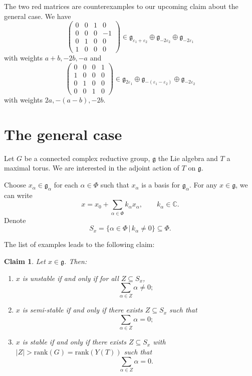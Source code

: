 \documentclass[12pt]{amsart}
\newcommand{\C}{\mathbb{C}}
\newcommand{\g}{\mathfrak{g}}
\newtheorem{claim}[theorem]{Claim}
\theoremstyle{remark}
\theoremstyle{remark}
\theoremstyle{remark}
\begin{document}
The two red matrices are counterexamples to our upcoming claim about the general case.
We have
$$
\begin{pmatrix} 
	0 & 0 & 1 & 0 \\ 
	0 & 0 & 0 & -1 \\
	0 & 1 & 0 & 0 \\
	1 & 0 & 0 & 0
\end{pmatrix} \in \g_{\varepsilon_1+\varepsilon_2} \oplus \g_{-2\varepsilon_2} \oplus \g_{-2\varepsilon_1}$$
with weights $a+b, -2b, -a$ and 
$$
\begin{pmatrix} 
	0 & 0 & 0 & 1 \\ 
	1 & 0 & 0 & 0 \\
	0 & 1 & 0 & 0 \\
	0 & 0 & 1 & 0
\end{pmatrix} \in \g_{2\varepsilon_1} \oplus \g_{-(\varepsilon_1 - \varepsilon_2)} \oplus \g_{-2\varepsilon_2}$$
with weights $2a, -(a-b), -2b$.

\section*{The general case}
Let $G$ be a connected complex reductive group, $\g$ the Lie algebra and $T$ a maximal torus.
We are interested in the adjoint action of $T$ on $\g$.

Choose $x_\alpha \in \g_\alpha$ for each $\alpha \in \Phi$ such that $x_\alpha$ is a basis for $\g_\alpha$.
For any $x \in \g$, we can write
$$x = x_0 + \sum_{\alpha \in \Phi} k_\alpha x_\alpha, \qquad k_\alpha \in \C.$$
Denote
$$S_x = \{\alpha \in \Phi \, | \, k_\alpha \ne 0\} \subseteq \Phi.$$

The list of examples leads to the following claim:

\begin{claim}
Let $x \in \g$.
Then:
\begin{enumerate}[label=(\roman*)]
\item
$x$ is unstable if and only if for all $Z \subseteq S_x$, 
$$\sum_{\alpha \in Z} \alpha \ne 0;$$

\item
$x$ is semi-stable if and only if there exists $Z \subseteq S_x$ such that
$$\sum_{\alpha \in Z} \alpha = 0;$$

\item
$x$ is stable if and only if there exists $Z \subseteq S_x$ with $|Z| > \mathrm{rank}(G) = \mathrm{rank}(Y(T))$ such that
$$\sum_{\alpha \in Z} \alpha = 0.$$
\end{enumerate}
\end{claim}
\end{document}
